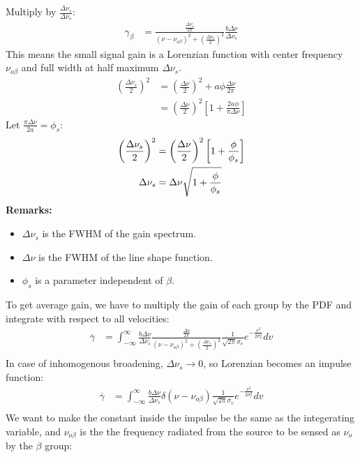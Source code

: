 \documentclass[11pt]{article}
\begin{document}
Multiply by $\frac{\Delta \nu_s}{\Delta \nu_s}$:
\begin{align*}
    \gamma_{\beta} &= \frac{\frac{\Delta \nu_s}{2 \pi}}{(\nu - \nu_{o \beta})^2 + \left(\frac{\Delta \nu_s}{2}\right)^2} \frac{b \Delta \nu}{\Delta \nu_s}
\end{align*}
This means the small signal gain is a Lorenzian function with center frequency $\nu_{o \beta}$ and full width at half maximum $\Delta \nu_s$.
\begin{align*}
    \left(\frac{\Delta \nu_s}{2}\right)^2 &= \left(\frac{\Delta \nu}{2}\right)^2 + a \phi \frac{\Delta \nu}{2 \pi} \\
    &= \left(\frac{\Delta \nu}{2}\right)^2 \left[ 1 + \frac{2a \phi}{\pi \Delta \nu} \right]
\end{align*}
\setcounter{equation}{0}
Let $\frac{\pi \Delta \nu}{2a} = \phi_s$:
\begin{align}
    \left(\frac{\Delta \nu_s}{2}\right)^2 &= \left(\frac{\Delta \nu}{2}\right)^2 \left[ 1 + \frac{\phi}{\phi_s} \right] \notag \\
    \Delta \nu_s &= \Delta \nu \sqrt{1 + \frac{\phi}{\phi_s}}
\end{align}
\textbf{Remarks:}
\begin{itemize}
    \item $\Delta \nu_s$ is the FWHM of the gain spectrum.
    \item $\Delta \nu$ is the FWHM of the line shape function.
    \item $\phi_s$ is a parameter independent of $\beta$.
\end{itemize}
To get average gain, we have to multiply the gain of each group by the PDF and integrate with respect to all velocities:
\begin{align*}
    \overline{\gamma} &= \int_{-\infty}^{\infty} \frac{b \Delta \nu}{\Delta \nu_s} \frac{\frac{\Delta \nu}{2 \pi}}{(\nu - \nu_{o \beta})^2 + \left(\frac{\Delta \nu_s}{2}\right)^2} \frac{1}{\sqrt{2 \pi} \sigma_v} e^{-\frac{v^2}{2 \sigma_v^2}} dv \\ 
\end{align*}
In case of inhomogenous broadening, $\Delta \nu_s \rightarrow 0$, so Lorenzian becomes an impulse function:
\begin{align*}
    \overline{\gamma} &= \int_{-\infty}^{\infty} \frac{b \Delta \nu}{\Delta \nu_s} \delta(\nu - \nu_{o \beta}) \frac{1}{\sqrt{2 \pi} \sigma_v} e^{-\frac{v^2}{2 \sigma_v^2}} dv \\
\end{align*}
We want to make the constant inside the impulse be the same as the integerating variable, and $\nu_{o \beta}$ is the the frequency radiated from the source to be sensed as $\nu_o$ by the $\beta$ group:
\end{document}
